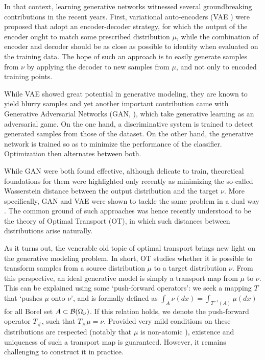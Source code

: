 In that context, learning generative networks witnessed several groundbreaking contributions in the recent years. First, variational auto-encoders (VAE \cite{kingma2013VAE}) were proposed that adopt an encoder-decoder strategy, for which the output of the encoder ought to match some prescribed distribution $\mu$, while the combination of encoder and decoder should be as close as possible to identity when evaluated on the training data. The hope of such an approach is to easily generate samples from $\nu$ by applying the decoder to new samples from $\mu$, and not only to encoded training points.%

While VAE showed great potential in generative modeling, they are known to yield blurry samples and yet another important contribution came with Generative Adversarial Networks (GAN, \cite{goodfellow2014generative,salimans2016improved,eghbal2017probabilistic}), which take generative learning as an adversarial game. On the one hand, a discriminative system is trained to detect generated samples from those of the dataset. On the other hand, the generative network is trained so as to minimize the performance of the classifier. Optimization then alternates between both.


While GAN were both found effective, although delicate to train, theoretical foundations for them were highlighted only recently \cite{bousquet2017optimal} as minimizing the so-called Wasserstein distance between the output distribution and the target $\nu$. More specifically, GAN and VAE were shown to tackle the same problem in a dual way \cite{bousquet2017optimal,genevay2017gan}. The common ground of such approaches was hence recently understood to be the theory of Optimal Transport (OT), in which such distances between distributions arise naturally.

As it turns out, the venerable old topic of optimal transport brings new light on the generative modeling problem. In short, OT studies whether it is possible to transform samples from a source distribution $\mu$ to a target distribution $\nu$. From this perspective, an ideal generative model is simply a transport map from $\mu$ to $\nu$.
%
This can be explained using some `push-forward operators': we seek a mapping $T$ that `pushes $\mu$ onto $\nu$', and is formally defined as $\int_A \nu(dx) = \int_{T^{-1}(A)} \mu(dx) $ for all Borel set $A \subset {\cal B}(\Omega_\nu)$. If this relation holds, we denote the push-forward operator $T_\#$, such that $T_\# \mu = \nu$. Provided very mild conditions on these distributions are respected (notably that $\mu$ is non-atomic \cite{villani2008optimal}), existence and uniqueness of such a transport map is guaranteed. However, it remains challenging to construct it in practice.

